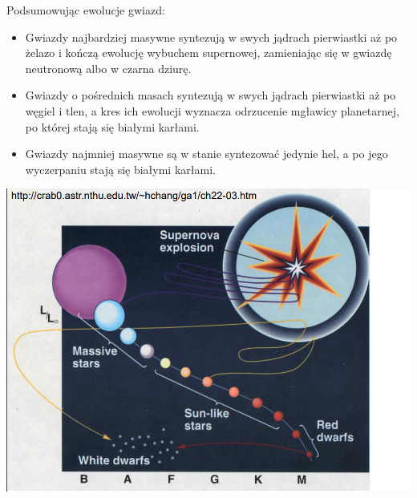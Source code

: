 \documentclass[../index.tex]{subfiles}
\begin{document}
            Podsumowując ewolucje gwiazd:
            \begin{itemize}
                \item Gwiazdy najbardziej masywne syntezują w swych jądrach pierwiastki aż po żelazo i kończą ewolucję wybuchem supernowej, zamieniając się w gwiazdę neutronową albo w czarna dziurę.
                \item Gwiazdy o pośrednich masach syntezują w swych jądrach pierwiastki aż po węgiel i tlen, a kres ich ewolucji wyznacza odrzucenie mgławicy planetarnej, po której stają się białymi karłami.
                \item Gwiazdy najmniej masywne są w stanie syntezować jedynie hel, a po jego wyczerpaniu stają się białymi karłami.
            \end{itemize}
            \begin{center}
                \includegraphics[width=15cm]{images/ewolucjaGwiazdPodsumowanie.png}
            \end{center}
\end{document}
